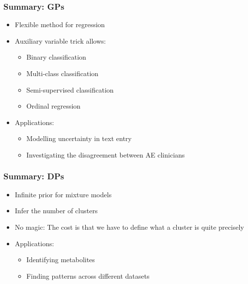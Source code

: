
\begin{frame}
	\frametitle{Summary: GPs}
	\begin{itemize}
		\item Flexible method for regression
		\item Auxiliary variable trick allows:
		\begin{itemize}
			\item Binary classification
			\item Multi-class classification
			\item Semi-supervised classification
			\item Ordinal regression
		\end{itemize}
		\item Applications:
		\begin{itemize}
			\item Modelling uncertainty in text entry
			\item Investigating the disagreement between \ac{AE} clinicians
		\end{itemize}
	\end{itemize}
\end{frame}


\begin{frame}
	\frametitle{Summary: DPs}
	\begin{itemize}
		\item Infinite prior for mixture models
		\item Infer the number of clusters
		\item No magic: The cost is that we have to define what a cluster is quite precisely
		\item Applications:
		\begin{itemize}
			\item Identifying metabolites
			\item Finding patterns across different datasets
		\end{itemize}
	\end{itemize}
\end{frame}

